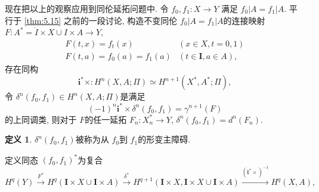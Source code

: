 \documentclass{ctexart}
\theoremstyle{plain}
\theoremstyle{definition}
\newtheorem{definition}[theorem]{定义}
\begin{document}
            现在把以上的观察应用到同伦延拓问题中. 令 $f_0,f_1:X\to Y$ 满足 $f_0|A=f_1|A$. 平行于 \ref{thm:5.15} 之前的一段讨论, 构造不变同伦 $f_0|A=f_1|A$的连接映射 $F:A^{*}=\dot{I}\times X\cup I\times A\to Y$, 
            \begin{equation*}
                \begin{array}{ll}
                    F(t, x)=f_t(x) & (x \in X, t=0,1) \\
                    F(t, a)=f_0(a)=f_1(a) & (t \in \mathbf{I}, a \in A) ,
                \end{array}
            \end{equation*}
            存在同构 
            \begin{equation*}
              \mathbf{i}^{*}\times : H^{n}(X,A;\Pi)\simeq H^{n+1}(X^{*},A^{*};\Pi),
            \end{equation*}
            令 $\delta^{n}(f_0,f_1)\in H^{n}(X,A;\Pi)$是满足 
            \begin{equation}
                \label{eq:defining property of primary deformation obstruction}
              (-1)^{n}\mathbf{i}^{*}\times \delta^{n}(f_0,f_1)=\gamma^{n+1}(F)
            \end{equation}
            的上同调类, 则对于 $F$的任一延拓 $F_{n}:X_{n}^{*}\to Y$, $\delta^{n}(f_0,f_1)=d^{n}(F_{n})$.

            \begin{definition}
                $\delta^{n}(f_0,f_1)$被称为从 $f_0$到 $f_1$的形变主障碍.
            \end{definition}

            定义同态 $(f_0,f_1)^{*}$为复合 
            \begin{equation*}
                    H^q(Y) \xrightarrow{F^*} H^q(\mathbf{I} \times X \cup \mathbf{I} \times A) \xrightarrow{\delta^*} 
                    H^{q+1}(\mathbf{I} \times X, \mathbf{I} \times X \cup \mathbf{I} \times A) \xrightarrow{\left(\mathbf{i}^* \times\right)^{-1}} H^q(X, A),
            \end{equation*}
\end{document}
